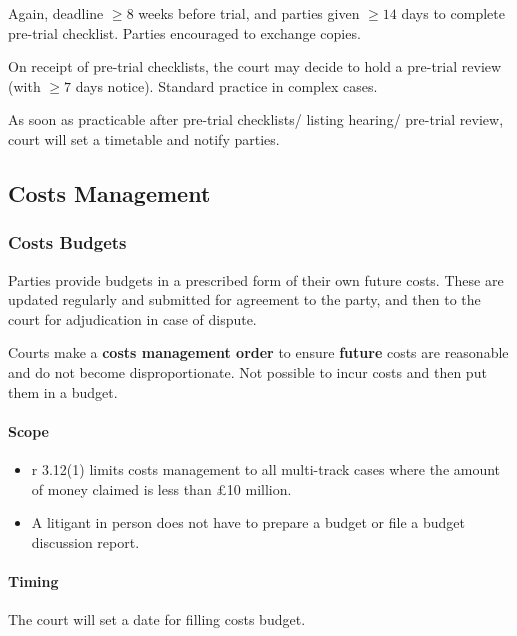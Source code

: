 \documentclass[
]{article}
\providecommand{\tightlist}{%
  \setlength{\itemsep}{0pt}\setlength{\parskip}{0pt}}
\begin{document}
Again, deadline \(\geq 8\) weeks before trial, and parties given
\(\geq 14\) days to complete pre-trial checklist. Parties encouraged to
exchange copies.

On receipt of pre-trial checklists, the court may decide to hold a
pre-trial review (with \(\geq 7\) days notice). Standard practice in
complex cases.

As soon as practicable after pre-trial checklists/ listing hearing/
pre-trial review, court will set a timetable and notify parties.

\hypertarget{costs-management}{%
\subsection{Costs Management}\label{costs-management}}

\hypertarget{costs-budgets}{%
\subsubsection{Costs Budgets}\label{costs-budgets}}

Parties provide budgets in a prescribed form of their own future costs.
These are updated regularly and submitted for agreement to the party,
and then to the court for adjudication in case of dispute.

Courts make a \textbf{costs management order} to ensure \textbf{future}
costs are reasonable and do not become disproportionate. Not possible to
incur costs and then put them in a budget.

\hypertarget{scope}{%
\paragraph{Scope}\label{scope}}

\begin{itemize}
\tightlist
\item
  r 3.12(1) limits costs management to all multi-track cases where the
  amount of money claimed is less than £10 million.
\item
  A litigant in person does not have to prepare a budget or file a
  budget discussion report.
\end{itemize}

\hypertarget{timing-1}{%
\paragraph{Timing}\label{timing-1}}

The court will set a date for filling costs budget.
\end{document}
